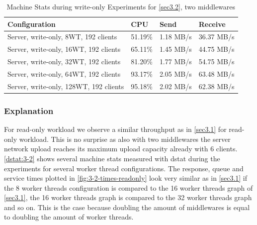 \documentclass[11pt,a4paper]{article}
\begin{document}
\begin{center}
    \begin{table}
    	\begin{tabular}{|l|p{2cm}|p{2cm}|p{2cm}|}
            \hline \textbf{Configuration} & \textbf{CPU} & \textbf{Send} & \textbf{Receive}\\
            \hline Server, write-only, 8WT, 192 clients & 51.19\%         & 1.18 MB/s    & 36.37 MB/s\\
            \hline Server, write-only, 16WT, 192 clients & 65.11\%         & 1.45 MB/s    & 44.75 MB/s\\
            \hline Server, write-only, 32WT, 192 clients & 81.20\%         & 1.77 MB/s    & 54.75 MB/s\\
            \hline Server, write-only, 64WT, 192 clients & 93.17\%         & 2.05 MB/s    & 63.48 MB/s\\
            \hline Server, write-only, 128WT, 192 clients & 95.18\%         & 2.02 MB/s    & 62.38 MB/s\\
            \hline
    	\end{tabular}
	\caption{Machine Stats during write-only Experiments for \autoref{sec3.2}, two middlewares}
    \label{dstat:3-2wo}
	\end{table}
\end{center}


\subsubsection{Explanation}
For read-only workload we observe a similar throughput as in \autoref{sec3.1} for read-only workload. This is no surprise as also with two middlewares the server network upload reaches its maximum upload capacity already with 6 clients. \autoref{dstat:3-2} shows several machine stats measured with dstat during the experiments for several worker thread configurations.
The response, queue and service times plotted in \autoref{fig:3-2-times-readonly} look very similar as in \autoref{sec3.1} if the 8 worker threads configuration is compared to the 16 worker threads graph of \autoref{sec3.1}, the 16 worker threads graph is compared to the 32 worker threads graph and so on. This is the case because doubling the amount of middlewares is equal to doubling the amount of worker threads.
\end{document}
